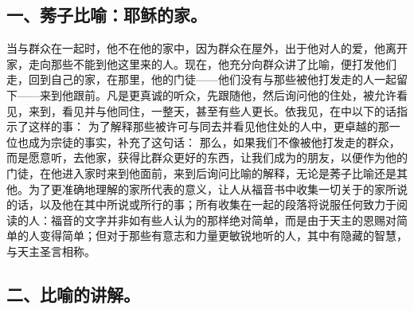 \subsection{一、莠子比喻：耶稣的家。}

 当与群众在一起时，他不在他的家中，因为群众在屋外，出于他对人的爱，他离开家，走向那些不能到他这里来的人。现在，他充分向群众讲了比喻，便打发他们走，回到自己的家，在那里，他的门徒——他们没有与那些被他打发走的人一起留下——来到他跟前。凡是更真诚的听众，先跟随他，然后询问他的住处，被允许看见，来到，看见并与他同住，一整天，甚至有些人更长。依我见，在中以下的话指示了这样的事： 为了解释那些被许可与同去并看见他住处的人中，更卓越的那一位也成为宗徒的事实，补充了这句话： 那么，如果我们不像被他打发走的群众，而是愿意听，去他家，获得比群众更好的东西，让我们成为的朋友，以便作为他的门徒，在他进入家时来到他面前，来到后询问比喻的解释，无论是莠子比喻还是其他。为了更准确地理解的家所代表的意义，让人从福音书中收集一切关于的家所说的话，以及他在其中所说或所行的事；所有收集在一起的段落将说服任何致力于阅读的人：福音的文字并非如有些人认为的那样绝对简单，而是由于天主的恩赐对简单的人变得简单；但对于那些有意志和力量更敏锐地听的人，其中有隐藏的智慧，与天主圣言相称。\par


\subsection{二、比喻的讲解。}

